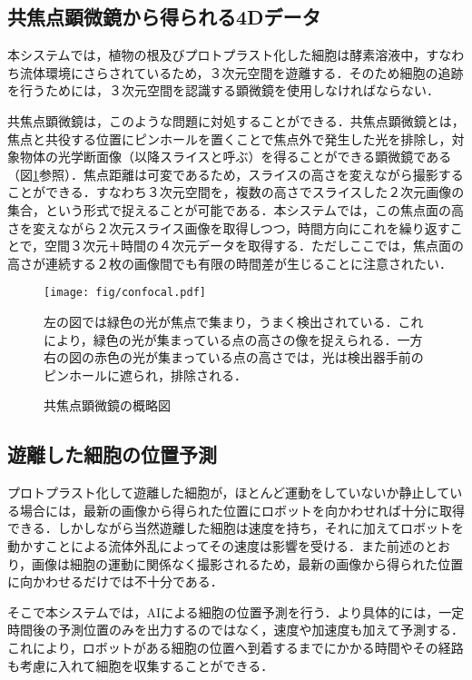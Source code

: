     \subsection{共焦点顕微鏡から得られる4Dデータ}
    本システムでは，植物の根及びプロトプラスト化した細胞は酵素溶液中，すなわち流体環境にさらされているため，３次元空間を遊離する．そのため細胞の追跡を行うためには，３次元空間を認識する顕微鏡を使用しなければならない．
    \par
    共焦点顕微鏡は，このような問題に対処することができる．共焦点顕微鏡とは，焦点と共役する位置にピンホールを置くことで焦点外で発生した光を排除し，対象物体の光学断面像（以降スライスと呼ぶ）を得ることができる顕微鏡である（図\ref{fig:confocal}参照）．焦点距離は可変であるため，スライスの高さを変えながら撮影することができる．すなわち３次元空間を，複数の高さでスライスした２次元画像の集合，という形式で捉えることが可能である．本システムでは，この焦点面の高さを変えながら２次元スライス画像を取得しつつ，時間方向にこれを繰り返すことで，空間３次元＋時間の４次元データを取得する．ただしここでは，焦点面の高さが連続する２枚の画像間でも有限の時間差が生じることに注意されたい．

    \begin{figure}[t]
        \centering
        \texttt{[image: fig/confocal.pdf]}
        \caption{共焦点顕微鏡の概略図}
        \small
        左の図では緑色の光が焦点で集まり，うまく検出されている．これにより，緑色の光が集まっている点の高さの像を捉えられる．一方右の図の赤色の光が集まっている点の高さでは，光は検出器手前のピンホールに遮られ，排除される．
        \label{fig:confocal}
    \end{figure}

    \subsection{遊離した細胞の位置予測}
    プロトプラスト化して遊離した細胞が，ほとんど運動をしていないか静止している場合には，最新の画像から得られた位置にロボットを向かわせれば十分に取得できる．しかしながら当然遊離した細胞は速度を持ち，それに加えてロボットを動かすことによる流体外乱によってその速度は影響を受ける．また前述のとおり，画像は細胞の運動に関係なく撮影されるため，最新の画像から得られた位置に向かわせるだけでは不十分である．
    \par
    そこで本システムでは，AIによる細胞の位置予測を行う．より具体的には，一定時間後の予測位置のみを出力するのではなく，速度や加速度も加えて予測する．これにより，ロボットがある細胞の位置へ到着するまでにかかる時間やその経路も考慮に入れて細胞を収集することができる．


